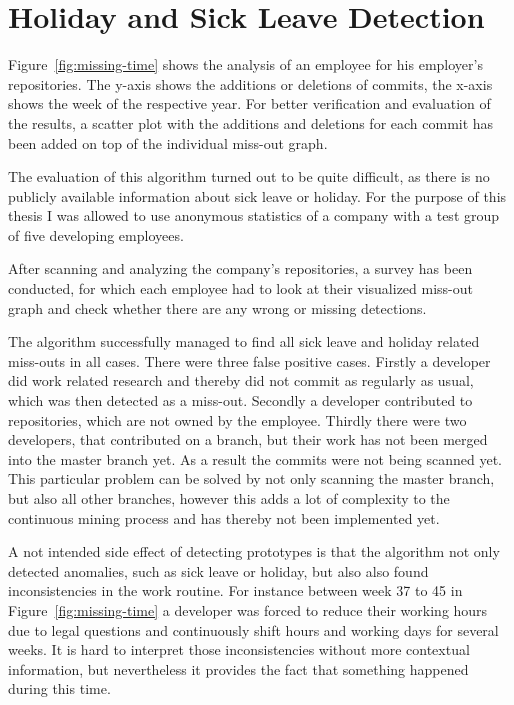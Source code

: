 \section{Holiday and Sick Leave Detection}

Figure~\ref{fig:missing-time} shows the analysis of an employee for his employer's repositories.
The y-axis shows the additions or deletions of commits, the x-axis shows the week of the respective year.
For better verification and evaluation of the results, a scatter plot with the additions and deletions for each commit has been added on top of the individual miss-out graph.

The evaluation of this algorithm turned out to be quite difficult, as there is no publicly available information about sick leave or holiday.
For the purpose of this thesis I was allowed to use anonymous statistics of a company with a test group of five developing employees.

After scanning and analyzing the company's repositories, a survey has been conducted, for which each employee had to look at their visualized miss-out graph and check whether there are any wrong or missing detections.

The algorithm successfully managed to find all sick leave and holiday related miss-outs in all cases.
There were three false positive cases.
Firstly a developer did work related research and thereby did not commit as regularly as usual, which was then detected as a miss-out.
Secondly a developer contributed to repositories, which are not owned by the employee.
Thirdly there were two developers, that contributed on a branch, but their work has not been merged into the master branch yet.
As a result the commits were not being scanned yet.
This particular problem can be solved by not only scanning the master branch, but also all other branches, however this adds a lot of complexity to the continuous mining process and has thereby not been implemented yet.

A not intended side effect of detecting prototypes is that the algorithm not only detected anomalies, such as sick leave or holiday, but also also found inconsistencies in the work routine.
For instance between week 37 to 45 in Figure~\ref{fig:missing-time} a developer was forced to reduce their working hours due to legal questions and continuously shift hours and working days for several weeks.
It is hard to interpret those inconsistencies without more contextual information, but nevertheless it provides the fact that something happened during this time.

